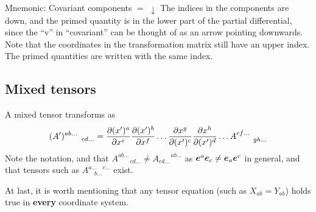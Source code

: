 \documentclass[a4paper, 12pt]{article}
\begin{document}
\vspace{0.5cm}
\begin{greenbox}{Mnemonic: Covariant components $= \; \downarrow$}
 The indices in the components are down, and the primed quantity is
 in the lower part of the partial differential, since the ``v'' in
 ``covariant'' can be thought of as an arrow pointing downwards. Note
 that the coordinates in the transformation matrix still have an upper
 index. The primed quantities are written with the same index.
\end{greenbox}


\subsection{Mixed tensors}
A mixed tensor transforms as
%
\begin{align*}
 (A')^{ab\ldots}_{\qquad cd\ldots} =
 \frac{\partial {(x')^{a}}}{\partial{x^{e}}}\frac{\partial {(x')^{b}}}{\partial{x^{f}}}\ldots
 \frac{\partial {x^{g}}}{\partial{(x')^{c}}}\frac{\partial {x^{h}}}{\partial{(x')^{d}}}\ldots
  A^{ef\ldots}_{\qquad gh\ldots}
\end{align*}
%
Note the notation, and that $A^{ab\ldots}_{\qquad cd\ldots} \neq
A^{\qquad ab\ldots}_{cd\ldots}$ as $\boldsymbol{e}^a\boldsymbol{e}_c \neq \boldsymbol{e}_a\boldsymbol{e}^c$ in
general, and that tensors such as $A^{a\ldots \quad c\ldots}_{\quad b\ldots}$
exist.

At last, it is worth mentioning that any tensor equation (such as
$X_{ab}=Y_{ab}$) holds true in \textbf{every} coordinate system.
\end{document}
